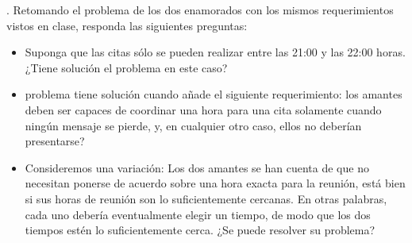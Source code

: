 . Retomando el problema de los dos enamorados con
los mismos requerimientos vistos en clase, responda
las siguientes preguntas:

\begin{itemize}
\item Suponga que las citas sólo se pueden realizar
  entre las 21:00 y las 22:00 horas. ¿Tiene solución
  el problema en este caso?

\item problema tiene solución cuando añade el siguiente
  requerimiento: los amantes deben ser capaces de coordinar
  una hora para una cita solamente cuando ningún mensaje
  se pierde, y, en cualquier otro caso, ellos no deberían
  presentarse?

\item Consideremos una variación: Los dos amantes se han
  cuenta de que no necesitan ponerse de acuerdo sobre una
  hora exacta para la reunión, está bien si sus horas de
  reunión son lo suficientemente cercanas. En otras palabras,
  cada uno debería eventualmente elegir un tiempo, de modo
  que los dos tiempos estén lo suficientemente cerca. ¿Se
  puede resolver su problema?
\end{itemize}
